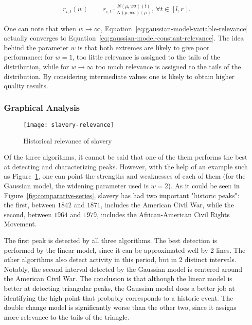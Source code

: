 \begin{align}
\label{eq:gaussian-model-variable-relevance}
r_{i, t} \left( w \right) &= r_{i, t} \cdot \frac{N \left( \mu, w \sigma \right) \left( t \right)}{N \left( \mu, w \sigma \right) \left( \mu \right)}, \, \forall t \in \left[ l, r \right].
\end{align}

One can note that when $w \to \infty$, Equation~\ref{eq:gaussian-model-variable-relevance} actually converges to Equation~\ref{eq:gaussian-model-constant-relevance}. The idea behind the parameter $w$ is that both extremes are likely to give poor performance: for $w = 1$, too little relevance is assigned to the tails of the distribution, while for $w \to \infty$ too much relevance is assigned to the tails of the distribution. By considering intermediate values one is likely to obtain higher quality results.

\subsubsection{Graphical Analysis}

\begin{figure}[t]
\centering
\texttt{[image: slavery-relevance]}
\caption{Historical relevance of slavery}
\label{fig:slavery-relevance}
\end{figure}

Of the three algorithms, it cannot be said that one of the them performs the best at detecting and characterizing peaks. However, with the help of an example such as Figure~\ref{fig:slavery-relevance}, one can point the strengths and weaknesses of each of them (for the Gaussian model, the widening parameter used is $w = 2$). As it could be seen in Figure~\ref{fig:comparative-series}, slavery has had two important "historic peaks": the first, between $1842$ and $1871$, includes the American Civil War, while the second, between $1964$ and $1979$, includes the African-American Civil Rights Movement.

The first peak is detected by all three algorithms. The best detection is performed by the linear model, since it can be approximated well by 2 lines. The other algorithms also detect activity in this period, but in 2 distinct intervals. Notably, the second interval detected by the Gaussian model is centered around the American Civil War. The conclusion is that although the linear model is better at detecting triangular peaks, the Gaussian model does a better job at identifying the high point that probably corresponds to a historic event. The double change model is significantly worse than the other two, since it assigns more relevance to the tails of the triangle.

